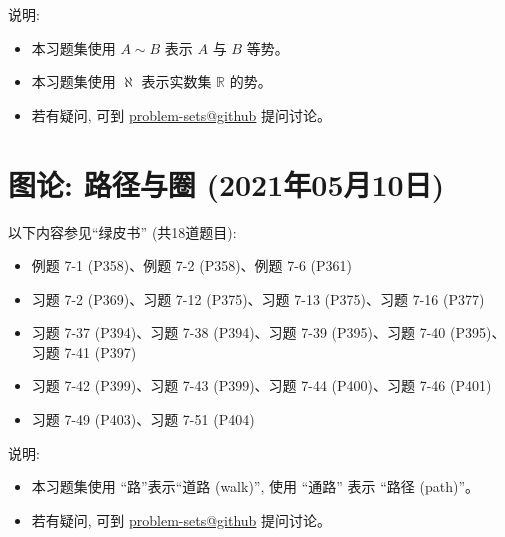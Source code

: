\documentclass{article}
\begin{document}
说明:
\begin{itemize}
  \item 本习题集使用 $A \sim B$ 表示 $A$ 与 $B$ 等势。
  \item 本习题集使用 $\aleph$ 表示实数集 $\mathbb{R}$ 的势。
  \item 若有疑问, 可到 \href{https://github.com/courses-at-nju-by-hfwei/discrete-math-problem-sets/discussions}{problem-sets@github} 提问讨论。
\end{itemize}
\section{图论: 路径与圈 (2021年05月10日)}

以下内容参见``绿皮书'' (共18道题目):
\begin{itemize}
  \item 例题 7-1 (P358)、例题 7-2 (P358)、例题 7-6 (P361)
  \item 习题 7-2 (P369)、习题 7-12 (P375)、习题 7-13 (P375)、习题 7-16 (P377)
  \item 习题 7-37 (P394)、习题 7-38 (P394)、习题 7-39 (P395)、习题 7-40 (P395)、
  习题 7-41 (P397)
  \item 习题 7-42 (P399)、习题 7-43 (P399)、习题 7-44 (P400)、习题 7-46 (P401)
  \item 习题 7-49 (P403)、习题 7-51 (P404)
\end{itemize}

说明:
\begin{itemize}
  \item 本习题集使用 ``路''表示``道路 (walk)'', 使用 ``通路'' 表示 ``路径 (path)''。
  \item 若有疑问, 可到 \href{https://github.com/courses-at-nju-by-hfwei/discrete-math-problem-sets/discussions}{problem-sets@github} 提问讨论。
\end{itemize}
\end{document}
